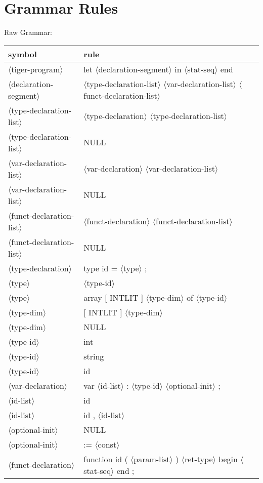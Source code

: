\documentclass[11pt, fleqn]{article}
\newcommand{\atag}[1]{$\langle$#1$\rangle$}
\begin{document}
\section{Grammar Rules}

Raw Grammar:

\begin{longtable}{l|l}
symbol							&	rule								\\
\hline
\atag{tiger-program}				&	let \atag{declaration-segment} in \atag{stat-seq} end				\\
\atag{declaration-segment}		&	\atag{type-declaration-list}	\atag{var-declaration-list} \atag{funct-declaration-list}	\\
\atag{type-declaration-list}		&	\atag{type-declaration} \atag{type-declaration-list}	\\
\atag{type-declaration-list}		&	NULL		\\
\atag{var-declaration-list}		&	\atag{var-declaration} \atag{var-declaration-list}	\\
\atag{var-declaration-list}		&	NULL		\\
\atag{funct-declaration-list}	&	\atag{funct-declaration} \atag{funct-declaration-list}	\\
\atag{funct-declaration-list}	&	NULL		\\
\atag{type-declaration}			&	type id = \atag{type} ;		\\
\atag{type}						&	\atag{type-id}		\\
\atag{type}						&	array [ INTLIT ] \atag{type-dim} of \atag{type-id}	\\
\atag{type-dim}					&	[ INTLIT ] \atag{type-dim}	\\
\atag{type-dim}					&	NULL		\\
\atag{type-id}					&	int		\\
\atag{type-id}					&	string		\\
\atag{type-id}					&	id		\\
\atag{var-declaration}			&	var \atag{id-list} : \atag{type-id} \atag{optional-init} ;		\\
\atag{id-list}					&	id		\\
\atag{id-list}					&	id , \atag{id-list}		\\
\atag{optional-init}				&	NULL		\\
\atag{optional-init}				&	:= \atag{const}		\\
\atag{funct-declaration}			&	function id ( \atag{param-list} ) \atag{ret-type} begin \atag{stat-seq} end ;	\\

\end{longtable}
\end{document}
